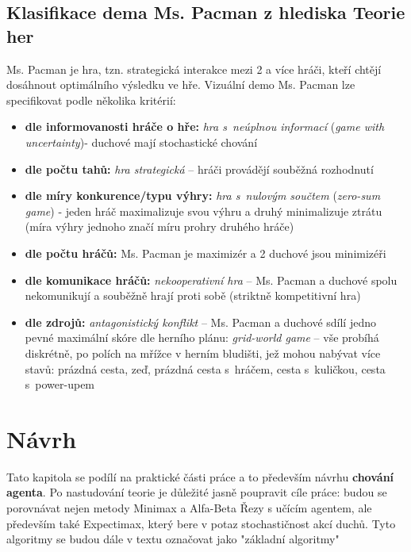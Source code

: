 \section{Klasifikace dema Ms. Pacman z hlediska Teorie her}
Ms. Pacman je hra, tzn. strategická interakce mezi 2 a více hráči, kteří chtějí dosáhnout optimálního výsledku ve hře.
Vizuální demo Ms. Pacman lze specifikovat podle několika kritérií:
\begin{itemize}
\item \textbf{dle informovanosti hráče o hře:} \textit{hra s neúplnou informací} (\textit{game with uncertainty})- duchové mají stochastické chování
\item \textbf{dle počtu tahů:} \textit{hra strategická} – hráči provádějí souběžná rozhodnutí
\item \textbf{dle míry konkurence/typu výhry:} \textit{hra s nulovým součtem} (\textit{zero-sum game})  - jeden hráč maximalizuje svou výhru a druhý minimalizuje ztrátu (míra výhry jednoho značí míru prohry druhého hráče)
\item \textbf{dle počtu hráčů:} Ms. Pacman je maximizér a 2 duchové jsou minimizéři
\item \textbf{dle komunikace hráčů:} \textit{nekooperativní hra} – Ms. Pacman a duchové spolu nekomunikují a souběžně hrají proti sobě (striktně kompetitivní hra)
\item \textbf{dle zdrojů:} \textit{antagonistický konflikt} – Ms. Pacman a duchové sdílí jedno pevné maximální skóre
dle herního plánu: \textit{grid-world game} – vše probíhá diskrétně, po polích na mřížce v herním bludišti, jež mohou nabývat více stavů: prázdná cesta, zeď, prázdná cesta s hráčem, cesta s kuličkou, cesta s power-upem
\end{itemize}
\chapter{Návrh}
Tato kapitola se podílí na praktické části práce a to především návrhu \textbf{chování agenta}.
Po nastudování teorie je důležité jasně poupravit cíle práce: budou se porovnávat nejen metody Minimax a Alfa-Beta Řezy s učícím agentem, ale především také Expectimax, který bere v potaz stochastičnost akcí duchů. Tyto algoritmy se budou dále v textu označovat jako "základní algoritmy"

